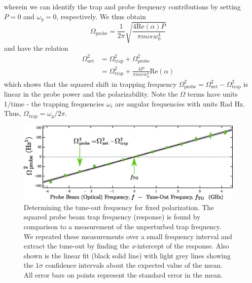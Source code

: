 	wherein we can identify the trap and probe frequency contributions by setting $P=0$ and $\omega_y=0$, respectively. 
	We thus obtain 
	\begin{equation}
		\Omega_\mathrm{probe} = \frac{1}{2\pi}\sqrt{\frac{4 \mathrm{Re}(\alpha)  P}{\pi m c \epsilon w_{0}^4}}
		\label{eqn:omega_probe}
	\end{equation}
	and have the relation
	\begin{align}
		\Omega_\mathrm{net}^2 &= \Omega_\mathrm{trap}^2 + \Omega_\mathrm{probe}^2\\
		&= \Omega_\mathrm{trap}^2 + \frac{4P}{\pi m c \epsilon w_{0}^4}\mathrm{Re}(\alpha)
		\label{eq:delta_omega_squared}
	\end{align}
	which shows that the squared shift in trapping frequency $\Omega_\mathrm{probe}^2 = \Omega_\mathrm{net}^2 - \Omega_\mathrm{trap}^2$ is linear in the probe power and the polarizability.
	Note the $\Omega$ terms have units 1/time - the trapping frequencies $\omega_i$ are angular frequencies with units Rad Hz. Thus, $\Omega_\textrm{trap} = \omega_y/2\pi$.
	
	\begin{figure}
	\includegraphics[width=\textwidth]{fig/tuneout/freq_scan}
	\caption{
	Determining the tune-out frequency for fixed polarization. The squared probe beam trap frequency (response) is found by comparison to a measurement of the unperturbed trap frequency. We repeated these measurements over a small frequency interval and extract the tune-out by finding the \textit{x}-intercept of the response. Also shown is the linear fit (black solid line) with light grey lines showing the \(1\sigma\) confidence intervals about the expected value of the mean. All error bars on points represent the standard error in the mean.
	}
	\label{fig:freq_scan} 
	\end{figure}

